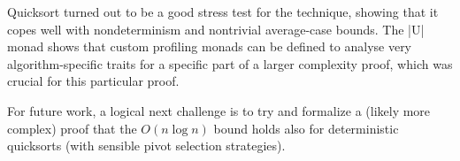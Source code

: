 \documentclass[runningheads]{llncs}
\begin{document}
Quicksort turned out to be a good stress test for the technique, showing that it copes well with nondeterminism and nontrivial average-case bounds. The |U| monad shows that custom profiling monads can be defined to analyse very algorithm-specific traits for a specific part of a larger complexity proof, which was crucial for this particular proof.

For future work, a logical next challenge is to try and formalize a (likely more complex) proof that the $O(n \log n)$ bound holds also for deterministic quicksorts (with sensible pivot selection strategies).



\end{document}
